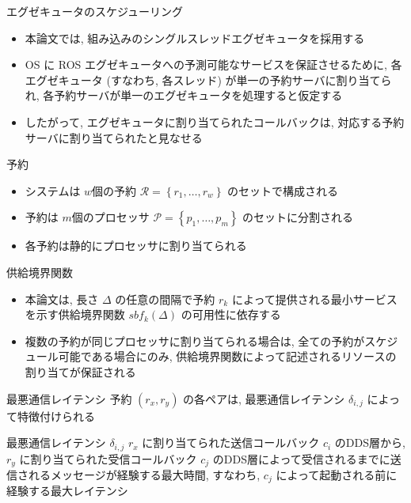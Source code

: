 \begin{frame}{エグゼキュータのスケジューリング}
    \begin{itemize}
        \item 本論文では, 組み込みのシングルスレッドエグゼキュータを採用する
        \item OS に ROS エグゼキュータへの予測可能なサービスを保証させるために, 各エグゼキュータ (すなわち, 各スレッド) が単一の予約サーバに割り当てられ, 各予約サーバが単一のエグゼキュータを処理すると仮定する
        \item したがって, エグゼキュータに割り当てられたコールバックは, 対応する予約サーバに割り当てられたと見なせる
    \end{itemize}
\end{frame}

\begin{frame}{予約}
    \begin{itemize}
        \item システムは $w$個の予約 $\mathcal{R}=\left\{r_{1}, \ldots, r_{w}\right\}$ のセットで構成される
        \item 予約は $m$個のプロセッサ $\mathcal{P}=\left\{p_{1}, \ldots, p_{m}\right\}$ のセットに分割される
        \item 各予約は静的にプロセッサに割り当てられる
    \end{itemize}
\end{frame}

\begin{frame}{供給境界関数}
    \begin{itemize}
        \item 本論文は, 長さ $\Delta$ の任意の間隔で予約 $r_{k}$ によって提供される最小サービスを示す供給境界関数 $s b f_{k}(\Delta)$ の可用性に依存する
        \item 複数の予約が同じプロセッサに割り当てられる場合は, 全ての予約がスケジュール可能である場合にのみ, 供給境界関数によって記述されるリソースの割り当てが保証される
    \end{itemize}
\end{frame}

\begin{frame}{最悪通信レイテンシ}
    予約 $\left(r_{x}, r_{y}\right)$ の各ペアは, 最悪通信レイテンシ $\delta_{i, j}$ によって特徴付けられる
    \begin{block}{最悪通信レイテンシ $\delta_{i, j}$}
        $r_x$ に割り当てられた送信コールバック $c_i$ のDDS層から, $r_y$ に割り当てられた受信コールバック $c_j$ のDDS層によって受信されるまでに送信されるメッセージが経験する最大時間, すなわち, $c_j$ によって起動される前に経験する最大レイテンシ
    \end{block}
\end{frame}

